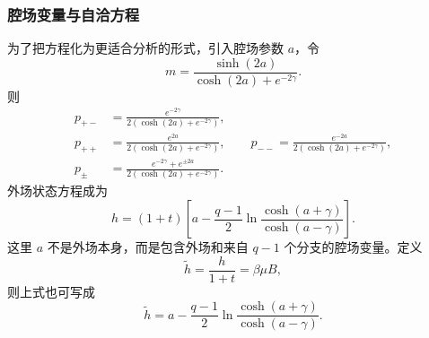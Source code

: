 \subsubsection{腔场变量与自洽方程}

为了把方程化为更适合分析的形式，引入腔场参数 \(a\)，令
\begin{equation*}
	m=\frac{\sinh(2a)}{\cosh(2a)+e^{-2\gamma}}.
\end{equation*}
则
\begin{align*}
	p_{+-}&=\frac{e^{-2\gamma}}
	{2\left(\cosh(2a)+e^{-2\gamma}\right)},\\
	p_{++}&=\frac{e^{2a}}
	{2\left(\cosh(2a)+e^{-2\gamma}\right)},\qquad
	p_{--}=\frac{e^{-2a}}
	{2\left(\cosh(2a)+e^{-2\gamma}\right)},\\
	p_\pm&=\frac{e^{-2\gamma}+e^{\pm2a}}
	{2\left(\cosh(2a)+e^{-2\gamma}\right)}.
\end{align*}
外场状态方程成为
\begin{equation*}
	h=(1+t)\left[
	a-\frac{q-1}{2}
	\ln\frac{\cosh(a+\gamma)}{\cosh(a-\gamma)}
	\right].
\end{equation*}
这里 \(a\) 不是外场本身，而是包含外场和来自 \(q-1\) 个分支的腔场变量。定义
\[
	\widetilde h=\frac{h}{1+t}=\beta\mu B,
\]
则上式也可写成
\[
	\widetilde h
	=a-\frac{q-1}{2}
	\ln\frac{\cosh(a+\gamma)}{\cosh(a-\gamma)}.
\]

